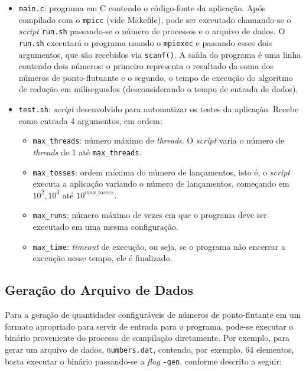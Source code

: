 \documentclass[12pt,a4paper]{article}
\begin{document}
\begin{itemize}
    \item \texttt{main.c}: programa em C contendo o código-fonte da aplicação.
        Após compilado com o \texttt{mpicc} (vide Makefile), pode ser executado
        chamando-se o \textit{script} \texttt{run.sh} passando-se o número de
        processos e o arquivo de dados. O \texttt{run.sh} executará o programa
        usando o \texttt{mpiexec} e passando esses dois argumentos, que são
        recebidos via \texttt{scanf()}. A saída do programa é uma linha contendo
        dois números: o primeiro representa o resultado da soma dos números de
        ponto-flutuante e o segundo, o tempo de execução do algoritmo de redução
        em milisegundos (desconsiderando o tempo de entrada de dados).
	\item \texttt{test.sh}: \textit{script} desenvolvido para automatizar os
		testes da aplicação. Recebe como entrada 4 argumentos, em ordem:
		\begin{itemize}
			\item \texttt{max\_threads}: número máximo de \textit{threads}. O
				\textit{script} varia o número de \textit{threads} de 1 até
				\texttt{max\_threads}.
            \item \texttt{max\_tosses}: ordem máxima do número de lançamentos,
                isto é, o \textit{script} executa a aplicação variando o número
                de lançamentos, começando em $10^2, 10^3$ até
                $10^{max\_tosses}$.
			\item \texttt{max\_runs}: número máximo de vezes em que o programa
				deve ser executado em uma mesma configuração.
			\item \texttt{max\_time}: \textit{timeout} de execução, ou seja, se o
				programa não encerrar a execução nesse tempo, ele é finalizado.
		\end{itemize}
\end{itemize}


\subsection{Geração do Arquivo de Dados}
\label{sec:data-gen}
Para a geração de quantidades configuráveis de números de ponto-flutante em um
formato apropriado para servir de entrada para o programa, pode-se executar o
binário proveniente do processo de compilação diretamente. Por exemplo, para
gerar um arquivo de dados, \texttt{numbers.dat}, contendo, por exemplo, 64
elementos, basta executar o binário passando-se a \textit{flag} \texttt{-gen},
conforme descrito a seguir:
\end{document}
